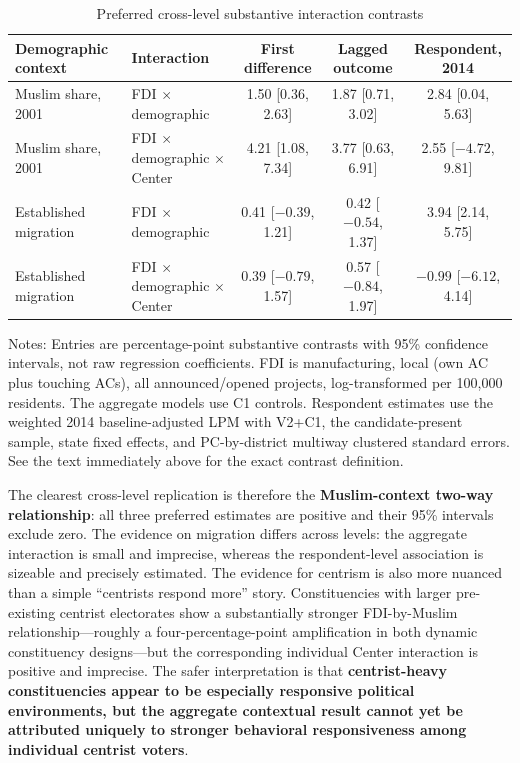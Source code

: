 \documentclass[11pt]{article}
\begin{document}
\begin{table}[!htbp]
\centering
\small
\caption{Preferred cross-level substantive interaction contrasts}
\label{tab:bridge}
\begin{threeparttable}
\begin{tabular}{llccc}
\toprule
Demographic context & Interaction & First difference & Lagged outcome & Respondent, 2014 \\
\midrule
Muslim share, 2001 & FDI $\times$ demographic & 1.50 [0.36, 2.63] & 1.87 [0.71, 3.02] & 2.84 [0.04, 5.63] \\
Muslim share, 2001 & FDI $\times$ demographic $\times$ Center & 4.21 [1.08, 7.34] & 3.77 [0.63, 6.91] & 2.55 [$-4.72$, 9.81] \\
Established migration & FDI $\times$ demographic & 0.41 [$-0.39$, 1.21] & 0.42 [$-0.54$, 1.37] & 3.94 [2.14, 5.75] \\
Established migration & FDI $\times$ demographic $\times$ Center & 0.39 [$-0.79$, 1.57] & 0.57 [$-0.84$, 1.97] & $-0.99$ [$-6.12$, 4.14] \\
\bottomrule
\end{tabular}
\begin{tablenotes}[flushleft]
\scriptsize
\item Notes: Entries are percentage-point substantive contrasts with 95\% confidence intervals, not raw regression coefficients. FDI is manufacturing, local (own AC plus touching ACs), all announced/opened projects, log-transformed per 100,000 residents. The aggregate models use C1 controls. Respondent estimates use the weighted 2014 baseline-adjusted LPM with V2+C1, the candidate-present sample, state fixed effects, and PC-by-district multiway clustered standard errors. See the text immediately above for the exact contrast definition.
\end{tablenotes}
\end{threeparttable}
\end{table}

The clearest cross-level replication is therefore the \textbf{Muslim-context two-way relationship}: all three preferred estimates are positive and their 95\% intervals exclude zero. The evidence on migration differs across levels: the aggregate interaction is small and imprecise, whereas the respondent-level association is sizeable and precisely estimated. The evidence for centrism is also more nuanced than a simple ``centrists respond more'' story. Constituencies with larger pre-existing centrist electorates show a substantially stronger FDI-by-Muslim relationship---roughly a four-percentage-point amplification in both dynamic constituency designs---but the corresponding individual Center interaction is positive and imprecise. The safer interpretation is that \textbf{centrist-heavy constituencies appear to be especially responsive political environments, but the aggregate contextual result cannot yet be attributed uniquely to stronger behavioral responsiveness among individual centrist voters}.
\end{document}
